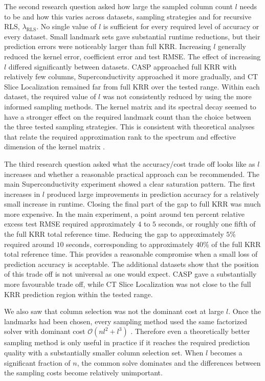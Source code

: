 The second research question asked how large the sampled column count $l$ needs to be and how this varies across datasets, sampling strategies and for recursive RLS, $\lambda_{\mathrm{RLS}}$. No single value of $l$ is sufficient for every required level of accuracy or every dataset. Small landmark sets gave substantial runtime reductions, but their prediction errors were noticeably larger than full KRR. Increasing $l$ generally reduced the kernel error, coefficient error and test RMSE. The effect of increasing $l$ differed significantly between datasets. CASP approached full KRR with relatively few columns, Superconductivity approached it more gradually, and CT Slice Localization remained far from full KRR over the tested range. Within each dataset, the required value of $l$ was not consistently reduced by using the more informed sampling methods. The kernel matrix and its spectral decay seemed to have a stronger effect on the required landmark count than the choice between the three tested sampling strategies. This is consistent with theoretical analyses that relate the required approximation rank to the spectrum and effective dimension of the kernel matrix \citep{bach2013sharp,rudi2015less}.

The third research question asked what the accuracy/cost trade off looks like as $l$ increases and whether a reasonable practical approach can be recommended. The main Superconductivity experiment showed a clear saturation pattern. The first increases in $l$ produced large improvements in prediction accuracy for a relatively small increase in runtime. Closing the final part of the gap to full KRR was much more expensive. In the main experiment, a point around ten percent relative excess test RMSE required approximately $4$ to $5$ seconds, or roughly one fifth of the full KRR total reference time. Reducing the gap to approximately $5\%$ required around $10$ seconds, corresponding to approximately $40\%$ of the full KRR total reference time. This provides a reasonable compromise when a small loss of prediction accuracy is acceptable. The additional datasets show that the position of this trade off is not universal as one would expect. CASP gave a substantially more favourable trade off, while CT Slice Localization was not close to the full KRR prediction region within the tested range.

We also saw that column selection was not the dominant cost at large $l$. Once the landmarks had been chosen, every sampling method used the same factorized solver with dominant cost $\mathcal{O}(nl^2+l^3)$ \citep{gittens2016revisiting}. Therefore even a theoretically better sampling method is only useful in practice if it reaches the required prediction quality with a substantially smaller column selection set. When $l$ becomes a significant fraction of $n$, the common solve dominates and the differences between the sampling costs become relatively unimportant.

